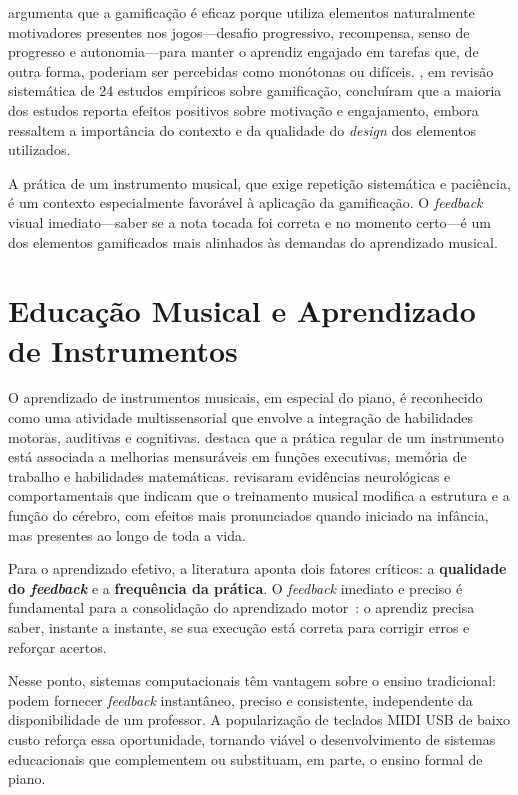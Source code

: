 \documentclass[
  12pt,
  openright,
  twoside,
  a4paper,
  english,
  brazil
]{abntex2}
\begin{document}
\textcite{kapp2012} argumenta que a gamificação é eficaz porque utiliza
elementos naturalmente motivadores presentes nos jogos---desafio
progressivo, recompensa, senso de progresso e autonomia---para manter o
aprendiz engajado em tarefas que, de outra forma, poderiam ser percebidas
como monótonas ou difíceis. \textcite{hamari2014}, em revisão sistemática
de 24 estudos empíricos sobre gamificação, concluíram que a maioria dos
estudos reporta efeitos positivos sobre motivação e engajamento, embora
ressaltem a importância do contexto e da qualidade do \textit{design} dos
elementos utilizados.

A prática de um instrumento musical, que exige repetição sistemática e
paciência, é um contexto especialmente favorável à aplicação da
gamificação. O \textit{feedback} visual imediato---saber se a nota tocada
foi correta e no momento certo---é um dos elementos gamificados mais
alinhados às demandas do aprendizado musical.

\section{Educação Musical e Aprendizado de Instrumentos}

O aprendizado de instrumentos musicais, em especial do piano, é
reconhecido como uma atividade multissensorial que envolve a integração
de habilidades motoras, auditivas e cognitivas. \textcite{hallam2015}
destaca que a prática regular de um instrumento está associada a
melhorias mensuráveis em funções executivas, memória de trabalho e
habilidades matemáticas. \textcite{miendlarzewska2014} revisaram
evidências neurológicas e comportamentais que indicam que o treinamento
musical modifica a estrutura e a função do cérebro, com efeitos mais
pronunciados quando iniciado na infância, mas presentes ao longo de
toda a vida.

Para o aprendizado efetivo, a literatura aponta dois fatores críticos:
a \textbf{qualidade do \textit{feedback}} e a
\textbf{frequência da prática}. O \textit{feedback} imediato e preciso
é fundamental para a consolidação do aprendizado motor~\cite{johansson2015}:
o aprendiz precisa saber, instante a instante, se sua execução está
correta para corrigir erros e reforçar acertos.

Nesse ponto, sistemas computacionais têm vantagem sobre o ensino
tradicional: podem fornecer \textit{feedback} instantâneo, preciso e
consistente, independente da disponibilidade de um professor. A
popularização de teclados MIDI USB de baixo custo reforça essa
oportunidade, tornando viável o desenvolvimento de sistemas educacionais
que complementem ou substituam, em parte, o ensino formal de piano.
\end{document}
